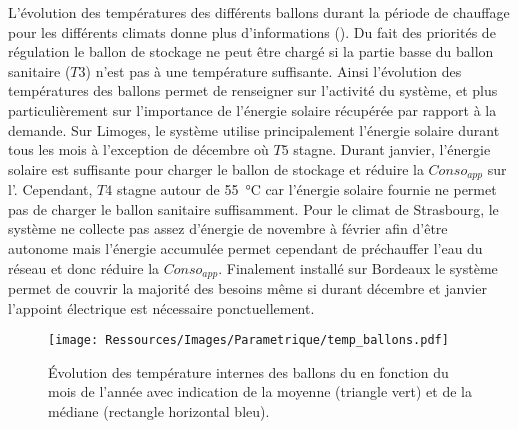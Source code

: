 L’évolution des températures des différents ballons durant la période de chauffage pour
les différents climats donne plus d’informations (). Du
fait des priorités de régulation le ballon de stockage ne peut être chargé si la partie
basse du ballon sanitaire ($T3$) n’est pas à une température suffisante. Ainsi l’évolution
des températures des ballons permet de renseigner sur l’activité du système, et plus
particulièrement sur l’importance de l’énergie solaire récupérée par rapport à la demande.
Sur Limoges, le système utilise principalement l’énergie solaire durant tous les
mois à l’exception de décembre où $T5$ stagne. Durant janvier, l’énergie solaire est
suffisante pour charger le ballon de stockage et réduire la $Conso_{app}$ sur
l’. Cependant, $T4$ stagne autour de \SI{55}{\celsius} car l’énergie solaire fournie
ne permet pas de charger le ballon sanitaire suffisamment. Pour le climat de Strasbourg, le système ne
collecte pas assez d’énergie de novembre à février afin d’être autonome mais l’énergie
accumulée permet cependant de préchauffer l’eau du réseau et donc réduire la
$Conso_{app}$. Finalement installé sur Bordeaux le système permet de couvrir la majorité des besoins
même si durant décembre et janvier l’appoint électrique est nécessaire ponctuellement.

\begin{figure}
    \centering
    \texttt{[image: Ressources/Images/Parametrique/temp\_ballons.pdf]}
    \caption[Évolution des température internes des ballons du ]
            {Évolution des température internes des ballons du  en fonction du mois
             de l’année avec indication de la moyenne (triangle vert) et
             de la médiane (rectangle horizontal bleu).}
    \label{fig:temp_ballon_mensuel}
\end{figure}


